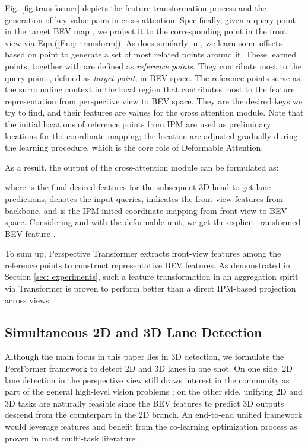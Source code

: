 \documentclass[runningheads]{llncs}
\begin{document}
Fig. \ref{fig:transformer} depicts the feature transformation process and the generation of key-value pairs in cross-attention.
Specifically, given a query point  in the target BEV map , we project it to the corresponding point  in the  front view via Eqn.(\ref{Enq: transform}). As does similarly in \cite{zhu2021deformable}, we learn some offsets based on point  
to generate a set of most related points around it. 
{These learned points, together with  are defined as \textit{reference points}.}
They contribute most to the query point ,  defined as \textit{target point}, in BEV-space.
{The reference points} serve as {the surrounding context in the local region} that contributes most to the feature representation from perspective view to BEV space.
They are the desired keys we try to find, and their features are values for the cross attention module.
Note that the initial locations of reference points from IPM are used as preliminary locations for the coordinate mapping; 
the location 
are adjusted gradually during the learning procedure, which is the core role of Deformable Attention.




As a result, the output of the cross-attention module can be formulated as:

where  is the final desired features for the subsequent 3D head to get lane predictions, 
 denotes the input queries, 
 indicates the front view features from backbone, 
and  is 
the IPM-inited coordinate mapping from front view to BEV space. 
Considering  and  with the deformable unit, we get the explicit transformed BEV feature .







To sum up, Perspective Transformer extracts front-view features among the reference points to construct representative BEV features.
As demonstrated in Section \ref{sec: experiments}, such a feature transformation in an aggregation spirit via Transformer
is proven to perform better than a direct IPM-based projection across views. 




\subsection{Simultaneous 2D and 3D Lane Detection}
\label{sec: alg - anchor}



Although the main focus in this paper lies in 3D detection, we formulate the  PersFormer framework to detect 2D and 3D lanes in one shot. On one side, 2D lane detection in the perspective view still draws interest in the community as part of the general high-level vision problems \cite{abualsaud2021laneaf,tabelini2021keep,liu2021condlanenet,qu2021focus}; on the other side, unifying 2D and 3D tasks are naturally feasible since the BEV features to predict 3D outputs descend from the counterpart in the 2D branch. An end-to-end unified framework would leverage features and benefit from the co-learning optimization process as proven in most multi-task literature \cite{liang2019multi,vandenhende2021multi,kumar2021omnidet}.  
\end{document}
